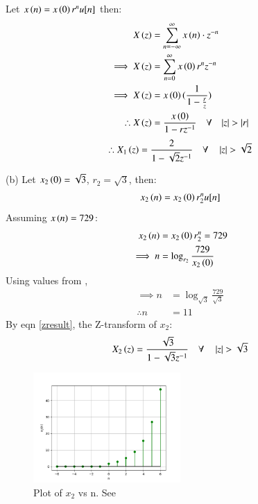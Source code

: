 \documentclass[journal,12pt,twocolumn]{IEEEtran}
\theoremstyle{remark}
\begin{document}
Let $x\left(n\right) = x\left(0\right)r^nu[n]$ then:
\begin{align}
    X\left(z\right) &= \sum_{n = -\infty}^{\infty}{x\left(n\right) \cdot z^{-n}}\\
    \implies X\left(z\right) &= \sum_{n = 0}^{\infty}{x\left(0\right)r^{n}z^{-n}}\\
    \implies X\left(z\right) &= x\left(0\right)(\frac{1}{1 - \frac{r}{z}})\\
	\therefore X\left(z\right) &= \frac{x\left(0\right)}{1 - rz^{-1}} \quad \forall \quad {\left\vert z\right\vert > \left\vert r\right\vert} \label{zresult}
\end{align}
\begin{align}
    \therefore X_1\left(z\right) = \frac{2}{1 - \sqrt{2}z^{-1}} \quad \forall \quad \left\vert z\right\vert > \sqrt{2}
\end{align}

(b) Let $x_2\left(0\right) = \sqrt{3}$, $r_2 = \sqrt{3}$, then:
\begin{align}
    x_2\left(n\right) = x_2\left(0\right) r_2^nu[n]
\end{align}
Assuming $x\left(n\right) = 729$:
\begin{align}
    x_2\left(n\right) &= x_2\left(0\right) r_2^n = 729\\
    \implies n &= \log_{r_2}{\frac{729}{x_2\left(0\right)}}
\end{align}
Using values from ,
\begin{align}
    \implies n &= \log_{\sqrt{3}}{\frac{729}{\sqrt{3}}}\\
    \therefore n &= 11
\end{align}
By eqn \ref{zresult}, the Z-transform of $x_2$:
\begin{align}
    X_2\left(z\right) = \frac{\sqrt{3}}{1 - \sqrt{3}z^{-1}} \quad \forall \quad \left\vert z\right\vert > \sqrt{3} 
\end{align}

\begin{figure}[h!]
    \renewcommand\thefigure{2}
    \centering
    \includegraphics[width=0.5\textwidth]{figs/b.png}
    \caption[short]{Plot of $x_2$ vs n. See }
    \label{fig:img2}
\end{figure}
\end{document}

